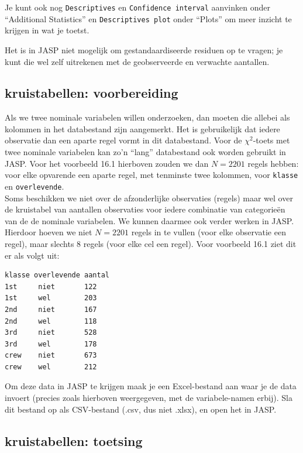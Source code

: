 \documentclass[
]{book}
\begin{document}
Je kunt ook nog \texttt{Descriptives} en \texttt{Confidence\ interval} aanvinken onder ``Additional Statistics'' en \texttt{Descriptives\ plot} onder ``Plots'' om meer inzicht te krijgen in wat je toetst.

Het is in JASP niet mogelijk om gestandaardiseerde residuen op te vragen; je kunt die wel zelf uitrekenen met de geobserveerde en verwachte aantallen.

\hypertarget{kruistabellen-voorbereiding-1}{%
\subsection{kruistabellen: voorbereiding}\label{kruistabellen-voorbereiding-1}}

Als we twee nominale variabelen willen onderzoeken, dan moeten die allebei als kolommen in het databestand zijn aangemerkt.
Het is gebruikelijk dat iedere observatie dan een aparte regel vormt in dit databestand. Voor de \(\chi^2\)-toets met twee nominale variabelen kan zo'n ``lang'' databestand ook worden gebruikt in JASP. Voor het voorbeeld 16.1 hierboven zouden we dan \(N=2201\) regels hebben: voor elke opvarende een aparte regel, met tenminste twee kolommen, voor \texttt{klasse} en \texttt{overlevende}.\\

Soms beschikken we niet over de afzonderlijke observaties (regels) maar
wel over de kruistabel van aantallen observaties voor iedere combinatie
van categorieën van de de nominale variabelen. We kunnen daarmee ook
verder werken in JASP. Hierdoor hoeven we niet \(N=2201\) regels in te vullen (voor elke observatie een regel), maar slechts 8 regels (voor elke cel een regel).
Voor voorbeeld 16.1 ziet dit er als volgt uit:

\begin{verbatim}
klasse overlevende aantal
1st     niet       122
1st     wel        203
2nd     niet       167
2nd     wel        118
3rd     niet       528
3rd     wel        178
crew    niet       673
crew    wel        212
\end{verbatim}

Om deze data in JASP te krijgen maak je een Excel-bestand aan waar je de data invoert (precies zoals hierboven weergegeven, met de variabele-namen erbij).
Sla dit bestand op als CSV-bestand (.csv, dus niet .xlsx), en open het in JASP.

\hypertarget{kruistabellen-toetsing-1}{%
\subsection{kruistabellen: toetsing}\label{kruistabellen-toetsing-1}}
\end{document}
